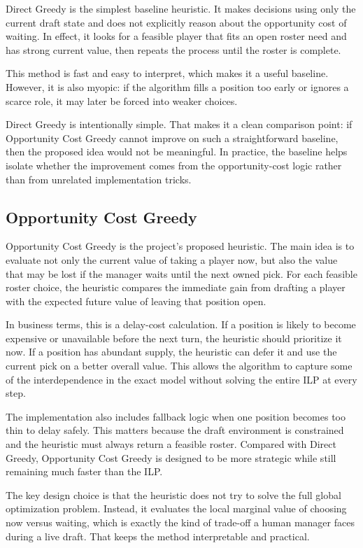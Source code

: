 \documentclass[10pt,a4paper]{article}
\begin{document}
Direct Greedy is the simplest baseline heuristic. It makes decisions using only the current draft state and does not explicitly reason about the opportunity cost of waiting. In effect, it looks for a feasible player that fits an open roster need and has strong current value, then repeats the process until the roster is complete.

This method is fast and easy to interpret, which makes it a useful baseline. However, it is also myopic: if the algorithm fills a position too early or ignores a scarce role, it may later be forced into weaker choices.

Direct Greedy is intentionally simple. That makes it a clean comparison point: if Opportunity Cost Greedy cannot improve on such a straightforward baseline, then the proposed idea would not be meaningful. In practice, the baseline helps isolate whether the improvement comes from the opportunity-cost logic rather than from unrelated implementation tricks.

\subsection{Opportunity Cost Greedy}

Opportunity Cost Greedy is the project's proposed heuristic. The main idea is to evaluate not only the current value of taking a player now, but also the value that may be lost if the manager waits until the next owned pick. For each feasible roster choice, the heuristic compares the immediate gain from drafting a player with the expected future value of leaving that position open.

In business terms, this is a delay-cost calculation. If a position is likely to become expensive or unavailable before the next turn, the heuristic should prioritize it now. If a position has abundant supply, the heuristic can defer it and use the current pick on a better overall value. This allows the algorithm to capture some of the interdependence in the exact model without solving the entire ILP at every step.

The implementation also includes fallback logic when one position becomes too thin to delay safely. This matters because the draft environment is constrained and the heuristic must always return a feasible roster. Compared with Direct Greedy, Opportunity Cost Greedy is designed to be more strategic while still remaining much faster than the ILP.

The key design choice is that the heuristic does not try to solve the full global optimization problem. Instead, it evaluates the local marginal value of choosing now versus waiting, which is exactly the kind of trade-off a human manager faces during a live draft. That keeps the method interpretable and practical.
\end{document}
